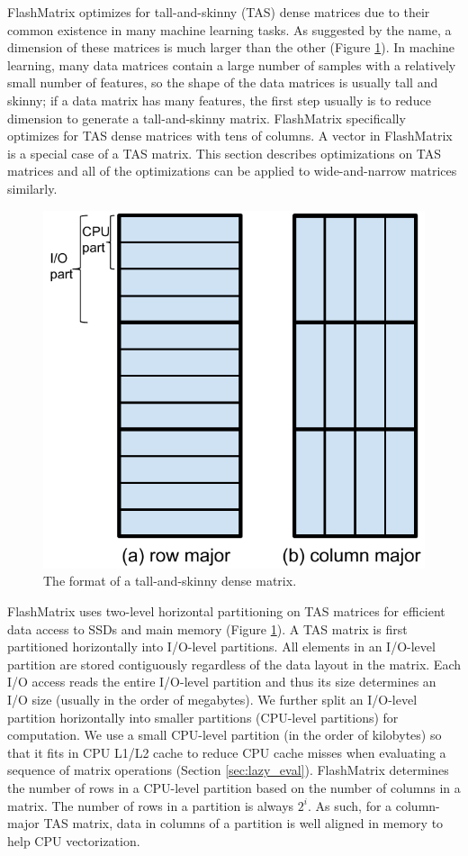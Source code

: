 FlashMatrix optimizes for tall-and-skinny (TAS) dense matrices due to their
common existence in many machine learning tasks. As suggested by the name,
a dimension of these matrices is much larger than the other (Figure \ref{fig:tas_mat}).
In machine learning, many data matrices contain a large number of samples with
a relatively small number of features, so the shape of the data matrices is
usually tall and skinny; if a data matrix has many features, the first step
usually is to reduce dimension to generate a tall-and-skinny matrix. FlashMatrix
specifically optimizes for TAS dense matrices with tens of columns.
A vector in FlashMatrix is a special case of a TAS
matrix. This section describes optimizations on TAS matrices and all of
the optimizations can be applied to wide-and-narrow matrices similarly.

\begin{figure}
	\centering
	\includegraphics[scale=0.5]{./dense_matrix.pdf}
	\caption{The format of a tall-and-skinny dense matrix.}
	\label{fig:tas_mat}
\end{figure}

FlashMatrix uses two-level horizontal partitioning on TAS matrices for efficient
data access to SSDs and main memory (Figure \ref{fig:tas_mat}). A TAS matrix
is first partitioned horizontally into I/O-level partitions. All elements in
an I/O-level partition
are stored contiguously regardless of the data layout in the matrix. Each I/O
access reads the entire I/O-level partition and thus its size determines an I/O
size (usually in the order of megabytes). We further split an I/O-level partition
horizontally into smaller partitions (CPU-level partitions) for computation.
We use a small
CPU-level partition (in the order of kilobytes) so that it fits in CPU L1/L2
cache to reduce CPU cache misses when evaluating a sequence of matrix
operations (Section \ref{sec:lazy_eval}).
FlashMatrix determines the number of rows in a CPU-level partition based on
the number of columns in a matrix. The number of rows in a partition
is always $2^i$. As such, for a column-major TAS matrix, data in columns of
a partition is well aligned in memory to help CPU vectorization.

